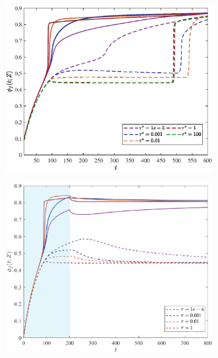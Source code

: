 \documentclass[12pt]{extarticle}
\begin{document}
\begin{figure}[h]
	\hspace{-10mm}
	\begin{subfigure}{0.32\textwidth}
		\hspace{3mm}
		\includegraphics[scale=0.3]{images/phasetau}
		\caption{}
	\end{subfigure}
\hspace{6mm}
	\begin{subfigure}{0.32\textwidth}
		\hspace{-7mm}
		\includegraphics[scale=0.28]{images/transient_flux4}
		\caption{}

\end{subfigure}
\end{figure}
\end{document}
